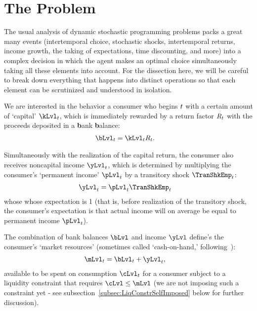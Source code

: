 
\hypertarget{the-problem}{}
\section{The Problem}\label{sec:the-problem}

The usual analysis of dynamic stochastic programming problems packs a great many events (intertemporal choice, stochastic shocks, intertemporal returns, income growth, the taking of expectations, time discounting, and more) into a complex decision in which the agent makes an optimal choice simultaneously taking all these elements into account. For the dissection here, we will be careful to break down everything that happens into distinct operations so that each element can be scrutinized and understood in isolation.

We are interested in the behavior a consumer who begins {\interval} $t$ with a certain amount of `capital' $\kLvl_{\prd}$, which is immediately rewarded by a return factor $R_{t}$  with the proceeds deposited in a \textbf{b}ank \textbf{b}alance:
\begin{equation}\begin{gathered}\begin{aligned}\label{eq:bLvl}
      \bLvl_{\prd} & = \kLvl_{\prd}\Rfree_{\prd}. 
    \end{aligned}\end{gathered}\end{equation}

Simultaneously with the realization of the capital return, the consumer also receives noncapital income $\yLvl_{\prd}$, which is determined by multiplying the consumer's `permanent income' $\pLvl_{\prd}$ by a transitory shock $\TranShkEmp_{\prd}$:
\begin{equation}\begin{gathered}\begin{aligned}
      \yLvl_{\prd} & = \pLvl_{\prd}\TranShkEmp_{\prd} \label{eq:yLvl}
    \end{aligned}\end{gathered}\end{equation}
whose whose expectation is 1 (that is, before realization of the transitory shock, the consumer's expectation is that actual income will on average be equal to permanent income $\pLvl_{\prd}$).

The combination of bank balances $\bLvl$ and income $\yLvl$ define's the consumer's `market resources' (sometimes called `cash-on-hand,' following~\cite{deatonUnderstandingC}):
\begin{equation}\begin{gathered}\begin{aligned}
      \mLvl_{\prd} & = \bLvl_{\prd}+\yLvl_{\prd} \label{eq:mLvl},
    \end{aligned}\end{gathered}\end{equation}
available to be spent on consumption $\cLvl_{\prd}$ for a consumer subject to a liquidity constraint that requires $\cLvl \leq \mLvl$ (we are not imposing such a constraint yet - see subsection~\ref{subsec:LiqConstrSelfImposed} below for further discussion).

